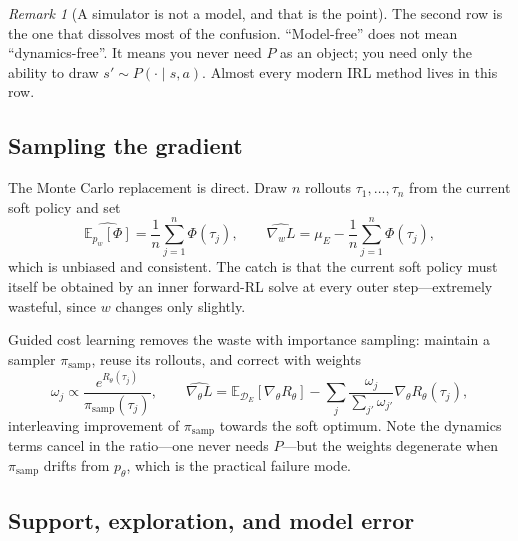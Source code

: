 \documentclass[11pt]{article}
\theoremstyle{plain}
\theoremstyle{definition}
\theoremstyle{remark}
\newtheorem{remark}[theorem]{Remark}
\newcommand{\E}{\mathbb{E}}
\newcommand{\samp}{\mathrm{samp}}
\begin{document}
\begin{remark}[A simulator is not a model, and that is the point]
The second row is the one that dissolves most of the confusion.
``Model-free'' does not mean ``dynamics-free''. It means you never need
$P$ as an object; you need only the ability to draw $s'\sim P(\cdot\mid
s,a)$. Almost every modern IRL method lives in this row.
\end{remark}

\subsection{Sampling the gradient}

The Monte Carlo replacement is direct. Draw $n$ rollouts
$\tau_1,\ldots,\tau_n$ from the current soft policy and set
\begin{equation}
\widehat{\E_{p_w}[\Phi]} = \frac1n\sum_{j=1}^n \Phi(\tau_j), \qquad
\widehat{\nabla_w L} = \mu_E - \frac1n\sum_{j=1}^n \Phi(\tau_j),
\label{eq:mcgrad}
\end{equation}
which is unbiased and consistent. The catch is that the current soft
policy must itself be obtained by an inner forward-RL solve at every outer
step---extremely wasteful, since $w$ changes only slightly.

Guided cost learning \cite{finn2016} removes the waste with importance
sampling: maintain a sampler $\pi_\samp$, reuse its rollouts, and correct
with weights
\begin{equation}
\omega_j \propto \frac{e^{R_\theta(\tau_j)}}{\pi_\samp(\tau_j)}, \qquad
\widehat{\nabla_\theta L} = \E_{\mathcal{D}_E}[\nabla_\theta R_\theta] -
\sum_j \frac{\omega_j}{\sum_{j'}\omega_{j'}} \nabla_\theta R_\theta(\tau_j),
\label{eq:gclgrad}
\end{equation}
interleaving improvement of $\pi_\samp$ towards the soft optimum. Note the
dynamics terms cancel in the ratio---one never needs $P$---but the weights
degenerate when $\pi_\samp$ drifts from $p_\theta$, which is the practical
failure mode.

\subsection{Support, exploration, and model error}
\end{document}
